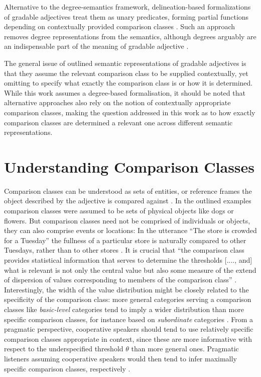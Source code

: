 Alternative to the degree-semantics framework, delineation-based formalizations of gradable adjectives treat them as unary predicates, forming partial functions depending on contextually provided comparison classes \parencite{Klein1980}. Such an approach removes degree representations from the semantics, although degrees arguably are an indispensable part of the meaning of gradable adjective \parencite{Solt2009}. 

The general issue of outlined semantic representations of gradable adjectives is that they assume the relevant comparison class to be supplied contextually, yet omitting to specify what exactly the comparison class is or how it is determined. 
While this work assumes a degree-based formalisation, it should be noted that alternative approaches also rely on the notion of contextually appropriate comparison classes, making the question addressed in this work as to how exactly comparison classes are determined a relevant one across different semantic representations.

\section{Understanding Comparison Classes}
\label{2.2.}
Comparison classes can be understood as sets of entities, or reference frames the object described by the adjective is compared against \parencite{Bierwisch1989, Solt2009, Klein1980}. In the outlined examples comparison classes were assumed to be sets of physical objects like dogs or flowers. But comparison classes need not be comprised of individuals or objects, they can also comprise events or locations: In the utterance “The store is crowded for a Tuesday” the fullness of a particular store is naturally compared to other Tuesdays, rather than to other stores \parencite{Solt2009}. It is crucial that “the comparison class provides statistical information that serves to determine the thresholds [...., and] what is relevant is not only the central value but also some measure of the extend of dispersion of values corresponding to members of the comparison class” \parencite[p.193]{Solt2009}.  Interestingly, the width of the value distribution might be closely related to the specificity of the comparison class: more general categories serving a comparison classes like \textit{basic-level} categories tend to imply a wider distribution than more specific comparison classes, for instance based on \textit{subordinate} categories \parencite{rosch1976}. From a pragmatic perspective, cooperative speakers should tend to use relatively specific comparison classes appropriate in context, since these are more informative with respect to the underspecified threshold $\theta$ than more general ones. Pragmatic listeners assuming cooperative speakers would then tend to infer maximally specific comparison classes, respectively \parencite{tessler2017warm}. 

